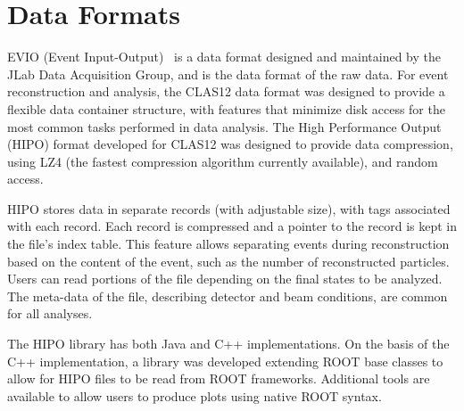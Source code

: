 \section{Data Formats}
\label{sec-formats}

EVIO (Event Input-Output)~\cite{evio} is a data format designed and maintained by the JLab Data Acquisition
Group, and is the data format of the raw data. For event reconstruction and analysis, the CLAS12 data format
was designed to provide a flexible data container structure, with features that minimize disk access for the
most common tasks performed in data analysis. The High Performance Output (HIPO) format developed for
CLAS12 was designed to provide data compression, using LZ4 (the fastest compression algorithm currently
available), and random access.

HIPO stores data in separate records (with adjustable size), with tags associated with each record. Each record
is compressed and a pointer to the record is kept in the file's index table. This feature allows separating events
during reconstruction based on the content of the event, such as the number of reconstructed particles. Users can
read portions of the file depending on the final states to be analyzed.  The meta-data of the file, describing detector
and beam conditions, are common for all analyses.

The HIPO library has both Java and C++ implementations. On the basis of the C++ implementation, a library was
developed extending ROOT base classes to allow for HIPO files to be read from ROOT frameworks. Additional
tools are available to allow users to produce plots using native ROOT syntax.
